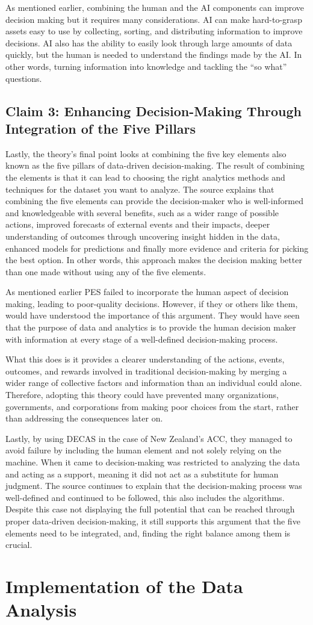 As mentioned earlier, combining the human and the AI components can improve decision making but it requires many considerations. AI can make hard-to-grasp assets easy to use by collecting, sorting, and distributing information to improve decisions. AI also has the ability to easily look through large amounts of data quickly, but the human is needed to understand the findings made by the AI. In other words, turning information into knowledge and tackling the “so what” questions.


\subsection{Claim 3: Enhancing Decision-Making Through Integration of the Five Pillars}

Lastly, the theory’s final point looks at combining the five key elements also known as the five pillars of data-driven decision-making. The result of combining the elements is that it can lead to choosing the right analytics methods and techniques for the dataset you want to analyze. The source explains that combining the five elements can provide the decision-maker who is well-informed and knowledgeable with several benefits, such as a wider range of possible actions, improved forecasts of external events and their impacts, deeper understanding of outcomes through uncovering insight hidden in the data, enhanced models for predictions and finally more evidence and criteria for picking the best option. In other words, this approach makes the decision making better than one made without using any of the five elements.

As mentioned earlier PES failed to incorporate the human aspect of decision making, leading to poor-quality decisions. However, if they or others like them, would have understood the importance of this argument. They would have seen that the purpose of data and analytics is to provide the human decision maker with information at every stage of a well-defined decision-making process.

What this does is it provides a clearer understanding of the actions, events, outcomes, and rewards involved in traditional decision-making by merging a wider range of collective factors and information than an individual could alone. Therefore, adopting this theory could have prevented many organizations, governments, and corporations from making poor choices from the start, rather than addressing the consequences later on.


Lastly, by using DECAS in the case of New Zealand’s ACC, they managed to avoid failure by including the human element and not solely relying on the machine. When it came to decision-making was restricted to analyzing the data and acting as a support, meaning it did not act as a substitute for human judgment. The source continues to explain that the decision-making process was well-defined and continued to be followed, this also includes the algorithms. Despite this case not displaying the full potential that can be reached through proper data-driven decision-making, it still supports this argument that the five elements need to be integrated, and, finding the right balance among them is crucial.

\section{Implementation of the Data Analysis}\label{sec:DataAndAnalytics}